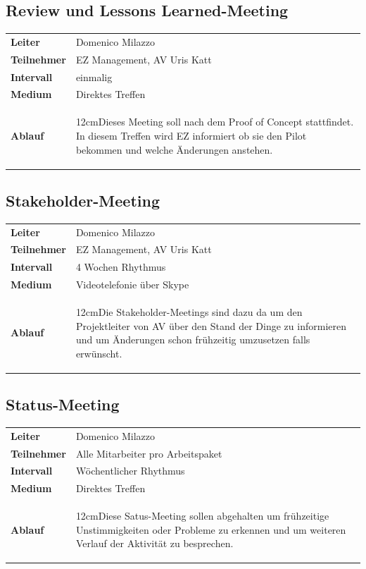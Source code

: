 \documentclass[a4paper,10pt]{scrartcl}
\newcommand\Absatz[2][12cm]{\begin{varwidth}{#1}\flushleft#2\end{varwidth}}
\begin{document}
\subsection{Review und Lessons Learned-Meeting}
\begin{tabular}{ll} 
\toprule
\textbf{Leiter} & Domenico Milazzo\\
\textbf{Teilnehmer}  & EZ Management, AV Uris Katt\\
\midrule 
\textbf{Intervall}  & einmalig\\
\midrule 
\textbf{Medium}  & Direktes Treffen\\
\midrule 
\textbf{Ablauf}  & {\Absatz{Dieses Meeting soll nach dem Proof of Concept stattfindet. In diesem 
Treffen wird EZ informiert ob sie den Pilot bekommen und welche Änderungen anstehen.\linebreak}}\\
\bottomrule
\end{tabular}

\subsection{Stakeholder-Meeting}
\begin{tabular}{ll} 
\toprule
\textbf{Leiter} & Domenico Milazzo\\
\textbf{Teilnehmer}  & EZ Management, AV Uris Katt\\
\midrule 
\textbf{Intervall}  & 4 Wochen Rhythmus\\
\midrule 
\textbf{Medium}  & Videotelefonie über Skype\\
\midrule 
\textbf{Ablauf}  & {\Absatz{Die Stakeholder-Meetings sind dazu da um den Projektleiter von AV über den Stand der Dinge zu informieren und um Änderungen schon frühzeitig umzusetzen falls erwünscht. \linebreak}}\\
\bottomrule
\end{tabular}

\subsection{Status-Meeting}
\begin{tabular}{ll} 
\toprule
\textbf{Leiter} & Domenico Milazzo\\
\textbf{Teilnehmer}  & Alle Mitarbeiter pro Arbeitspaket\\
\midrule 
\textbf{Intervall}  & Wöchentlicher Rhythmus\\
\midrule 
\textbf{Medium}  & Direktes Treffen\\
\midrule 
\textbf{Ablauf}  & {\Absatz{Diese Satus-Meeting sollen abgehalten um frühzeitige Unstimmigkeiten oder Probleme zu erkennen und um weiteren Verlauf der Aktivität zu besprechen. \linebreak}}\\
\bottomrule
\end{tabular}
\end{document}
